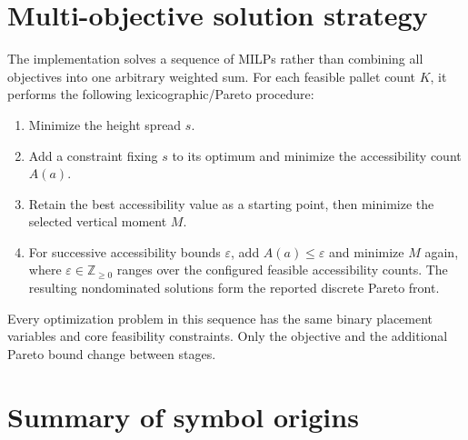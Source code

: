 \documentclass[11pt]{article}
\begin{document}
\section{Multi-objective solution strategy}

The implementation solves a sequence of MILPs rather than combining all
objectives into one arbitrary weighted sum.  For each feasible pallet count
$K$, it performs the following lexicographic/Pareto procedure:

\begin{enumerate}[label=\arabic*.]
  \item Minimize the height spread $s$.
  \item Add a constraint fixing $s$ to its optimum and minimize the
    accessibility count $A(a)$.
  \item Retain the best accessibility value as a starting point, then minimize
    the selected vertical moment $M$.
  \item For successive accessibility bounds $\varepsilon$, add
    $A(a)\le\varepsilon$ and minimize $M$ again, where
    $\varepsilon\in\mathbb Z_{\ge0}$ ranges over the configured feasible
    accessibility counts.  The resulting nondominated solutions form the
    reported discrete Pareto front.
\end{enumerate}

Every optimization problem in this sequence has the same binary placement
variables and core feasibility constraints.  Only the objective and the
additional Pareto bound change between stages.

\section{Summary of symbol origins}
\end{document}
